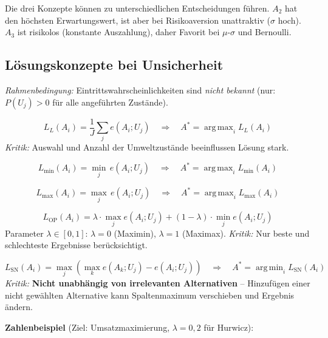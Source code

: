 Die drei Konzepte können zu unterschiedlichen Entscheidungen führen. $A_2$ hat den höchsten Erwartungswert, ist aber bei Risikoaversion unattraktiv ($\sigma$ hoch). $A_3$ ist risikolos (konstante Auszahlung), daher Favorit bei $\mu$-$\sigma$ und Bernoulli.

\newpage

\subsection{Lösungskonzepte bei Unsicherheit}

\textit{Rahmenbedingung:} Eintrittswahrscheinlichkeiten sind \emph{nicht bekannt} (nur: $P(U_j) > 0$ für alle angeführten Zustände).

\[
L_L(A_i) = \frac{1}{J}\sum_j e(A_i; U_j) \quad \Rightarrow \quad A^* = \operatorname{arg\,max}_i L_L(A_i)
\]
\textit{Kritik:} Auswahl und Anzahl der Umweltzustände beeinflussen Lösung stark.

\[
L_{\min}(A_i) = \min_j\, e(A_i; U_j) \quad \Rightarrow \quad A^* = \operatorname{arg\,max}_i L_{\min}(A_i)
\]

\[
L_{\max}(A_i) = \max_j\, e(A_i; U_j) \quad \Rightarrow \quad A^* = \operatorname{arg\,max}_i L_{\max}(A_i)
\]

\[
L_{\mathrm{OP}}(A_i) = \lambda\cdot\max_j e(A_i;U_j) + (1-\lambda)\cdot\min_j e(A_i;U_j)
\]
Parameter $\lambda\in[0,1]$: $\lambda=0$ (Maximin), $\lambda=1$ (Maximax). \textit{Kritik:} Nur beste und schlechteste Ergebnisse berücksichtigt.

\[
L_{\mathrm{SN}}(A_i) = \max_j\!\left(\max_k e(A_k;U_j) - e(A_i;U_j)\right) \quad \Rightarrow \quad A^* = \operatorname{arg\,min}_i L_{\mathrm{SN}}(A_i)
\]
\textit{Kritik:} \textbf{Nicht unabhängig von irrelevanten Alternativen} -- Hinzufügen einer nicht gewählten Alternative kann Spaltenmaximum verschieben und Ergebnis ändern.

\textbf{Zahlenbeispiel} (Ziel: Umsatzmaximierung, $\lambda=0{,}2$ für Hurwicz):

